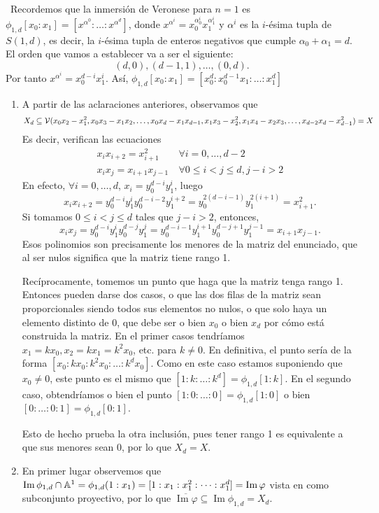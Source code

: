 \documentclass[twoside]{article}
\DeclareMathOperator{\Ima}{Im}
\begin{document}
\begin{solucion}\
Recordemos que la inmersión de Veronese para $n=1$ es $\phi_{1,d}[x_0:x_1]=[x^{\alpha^0}:\dots:x^{\alpha^d}]$, donde $x^{\alpha^i}=x_0^{\alpha^i_0}x_1^{\alpha^i_1}$ y $\alpha^i$ es la $i$-ésima tupla de $S(1,d)$, es decir, la $i$-ésima tupla de enteros negativos que cumple $\alpha_0+\alpha_1=d$. El orden que vamos a establecer va a ser el siguiente: $$(d,0),(d-1,1),\dots, (0,d).$$
Por tanto $x^{\alpha^i}=x_0^{d-i}x_1^i$. Así, $\phi_{1,d}[x_0:x_1]=[x_0^d:x_0^{d-1}x_1:\dots:x_1^d]$
\begin{enumerate}
\item A partir de las aclaraciones anteriores, observamos que $$X_d\subseteq\mathcal{V}(x_0x_2-x_1^2,x_0x_3-x_1x_2,\dots, x_0x_d-x_1x_{d-1},x_1x_3-x_2^2,x_1x_4-x_2x_3,\dots, x_{d-2}x_d-x_{d-1}^2)=X$$
Es decir, verifican las ecuaciones
\begin{align*}
x_ix_{i+2}=x_{i+1}^2\ &\forall i=0,\dots,d-2\\
x_ix_j=x_{i+1}x_{j-1}\ &\forall 0\leq i< j\leq d, j-i>2
\end{align*}
En efecto, $\forall i=0,\dots,d$, $x_i=y_0^{d-i}y_1^i$, luego $$x_ix_{i+2}=y_0^{d-i}y_1^iy_0^{d-i-2}y_1^{i+2}=y_0^{2(d-i-1)}y_1^{2(i+1)}=x_{i+1}^2.$$ Si tomamos $0\leq i<j\leq d$ tales que $j-i>2$, entonces, $$x_ix_{j}=y_0^{d-i}y_1^iy_0^{d-j}y_1^{j}=y_0^{d-i-1}y_1^{i+1}y_0^{d-j+1}y_1^{j-1}=x_{i+1}x_{j-1}.$$
Esos polinomios son precisamente los menores de la matriz del enunciado, que al ser nulos significa que la matriz tiene rango 1.

Recíprocamente, tomemos un punto que haga que la matriz tenga rango 1. Entonces pueden darse dos casos, o que las dos filas de la matriz sean proporcionales siendo todos sus elementos no nulos, o que solo haya un elemento distinto de 0, que debe ser o bien $x_0$ o bien $x_d$ por cómo está construida la matriz. En el primer casos tendríamos $x_1=kx_0, x_2=kx_1=k^2x_0$, etc. para $k\neq 0$. En definitiva, el punto sería de la forma $[x_0:kx_0:k^2x_0:\dots:k^dx_0]$. Como en este caso estamos suponiendo que $x_0\neq 0$, este punto es el mismo que $[1:k:\dots:k^d]=\phi_{1,d}[1:k]$. En el segundo caso, obtendríamos o bien el punto $[1:0:\dots:0]=\phi_{1,d}[1:0]$ o bien $[0:\dots:0:1]=\phi_{1,d}[0:1].$

Esto de hecho prueba la otra inclusión, pues tener rango 1 es equivalente a que sus menores sean 0, por lo que $X_d=X$.

\item En primer lugar observemos que $\Ima{\phi_{1,d}}\cap\A^1=\phi_{1,d}(1:x_1)=[1:x_1:x_1^2:\dots:x_1^d]=\Ima{\varphi}$ vista en como subconjunto proyectivo, por lo que $\overline{\Ima{\varphi}}\subseteq \Ima{\phi_{1,d}}=X_d$. 


\end{enumerate}
\end{solucion}
\end{document}
